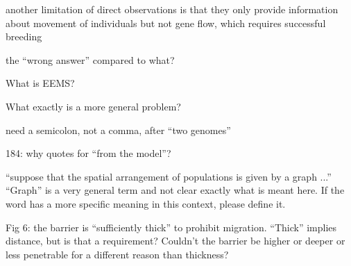 \reply{
}


\begin{point}{\revref}
    another limitation of direct observations is that they only provide
    information about movement of individuals but not gene flow, which requires
    successful breeding
\end{point}

\reply{
}

\begin{point}{\revref}
    the ``wrong answer'' compared to what?
\end{point}

\reply{
}

\begin{point}{\revref}
    What is EEMS?
\end{point}

\reply{
}

\begin{point}{\revref}
    What exactly is a more general problem?
\end{point}

\reply{
}

\begin{point}{\revref}
    need a semicolon, not a comma, after ``two genomes''
\end{point}


\begin{point}{184:}
    why quotes for ``from the model''?
\end{point}

\reply{
}

\begin{point}{}
    ``suppose that the spatial arrangement of populations is given by a graph
    ...''  ``Graph'' is a very general term and not clear exactly what is meant
    here.  If the word has a more specific meaning in this context, please
    define it.
\end{point}

\reply{
}

\begin{point}{Fig 6:}
    the barrier is ``sufficiently thick'' to prohibit migration.  ``Thick''
    implies distance, but is that a requirement?  Couldn’t the barrier be
    higher or deeper or less penetrable for a different reason than thickness?
\end{point}

\reply{
}



